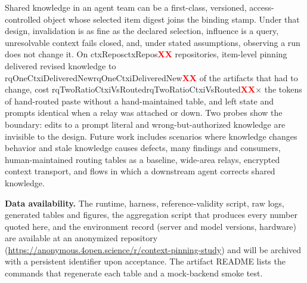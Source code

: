 \documentclass[10pt,conference]{IEEEtran}
\theoremstyle{definition}
\newcommand{\R}[1]{\ifcsname #1\endcsname\csname #1\endcsname\else\textcolor{red}{\textbf{XX}}\fi}
\begin{document}
Shared knowledge in an agent team can be a first-class, versioned, access-controlled object whose selected item
digest joins the binding stamp. Under that design, invalidation is as fine as the declared selection, influence
is a query, unresolvable context fails closed, and, under stated assumptions, observing a run does not change it.
On \R{ctxRepos} repositories, item-level pinning delivered revised knowledge to \R{rqOneCtxiDeliveredNew} of the
artifacts that had to change, cost \R{rqTwoRatioCtxiVsRouted}$\times$ the tokens of hand-routed paste without a
hand-maintained table, and left state and prompts identical when a relay was attached or down. Two probes show
the boundary: edits to a prompt literal and wrong-but-authorized knowledge are invisible to the design. Future
work includes scenarios where knowledge changes behavior and stale knowledge causes defects, many findings and
consumers, human-maintained routing tables as a baseline, wide-area relays, encrypted context transport, and
flows in which a downstream agent corrects shared knowledge.

\medskip\noindent\textbf{Data availability.}\label{sec:data} The runtime, harness, reference-validity script,
raw logs, generated tables and figures, the aggregation script that produces every number quoted here, and the
environment record (server and model versions, hardware) are available at an anonymized repository
(\url{https://anonymous.4open.science/r/context-pinning-study}) and will be archived with a persistent
identifier upon acceptance. The artifact README lists the commands that regenerate each table and a mock-backend
smoke test.



\end{document}
